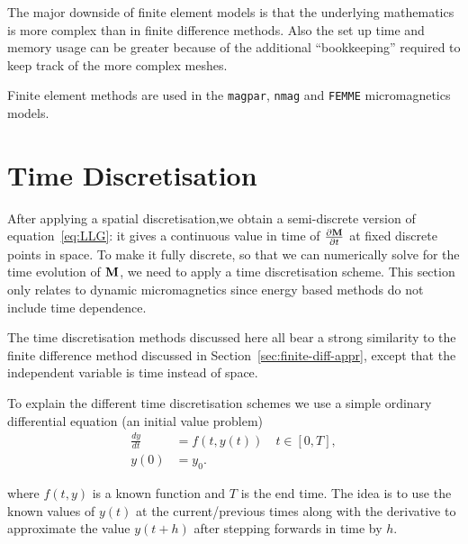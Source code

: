 The major downside of finite element models is that the underlying mathematics is more complex than in finite difference methods.
Also the set up time and memory usage can be greater because of the additional ``bookkeeping'' required to keep track of the more complex meshes.

Finite element methods are used in the \texttt{magpar}\cite{Scholz2003}, \texttt{nmag}\cite{Fischbacher2007} and \texttt{FEMME} micromagnetics models\cite{suessco-website}.



\section{Time Discretisation}
\label{sec:time-discretisation}

After applying a spatial discretisation,we obtain a semi-discrete version of  equation~\eqref{eq:LLG}: it gives a continuous value in time of $\frac{\partial \mathbf{M}}{\partial t}$ at fixed discrete points in space. To make it fully discrete, so that we can numerically solve for the time evolution of $\mathbf{M}$, we need to apply a time discretisation scheme. This section only relates to dynamic micromagnetics since energy based methods do not include time dependence.

The time discretisation methods discussed here all bear a strong similarity to the finite difference method discussed in Section~\ref{sec:finite-diff-appr}, except that the independent variable is time instead of space.

To explain the different time discretisation schemes we use a simple ordinary differential equation (an initial value problem)
\begin{equation}
  \begin{aligned}
    \frac{dy}{dt} &= f(t,y(t)) \quad t \in [0,T], \\
    y(0) &= y_0.
    \label{eq:45}
  \end{aligned}
\end{equation}

where $f(t,y)$ is a known function and $T$ is the end time. The idea is to use the known values of $y(t)$ at the current/previous times along with the derivative to approximate the value $y(t+h)$  after stepping forwards in time by $h$.

